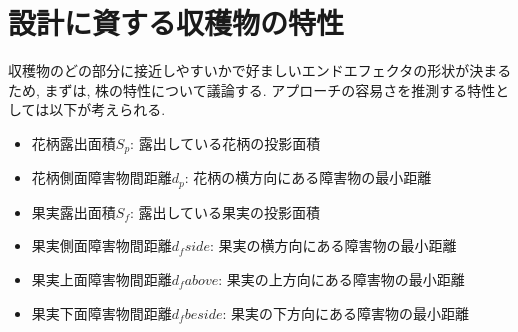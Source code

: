 \section{設計に資する収穫物の特性}
収穫物のどの部分に接近しやすいかで好ましいエンドエフェクタの形状が決まるため, まずは, 株の特性について議論する.
アプローチの容易さを推測する特性としては以下が考えられる.

\begin{itemize}
  \item 花柄露出面積$S_p$: 露出している花柄の投影面積
  \item 花柄側面障害物間距離$d_p$: 花柄の横方向にある障害物の最小距離
  \item 果実露出面積$S_f$: 露出している果実の投影面積
  \item 果実側面障害物間距離$d_fside$: 果実の横方向にある障害物の最小距離
  \item 果実上面障害物間距離$d_fabove$: 果実の上方向にある障害物の最小距離
  \item 果実下面障害物間距離$d_fbeside$: 果実の下方向にある障害物の最小距離
\end{itemize}
